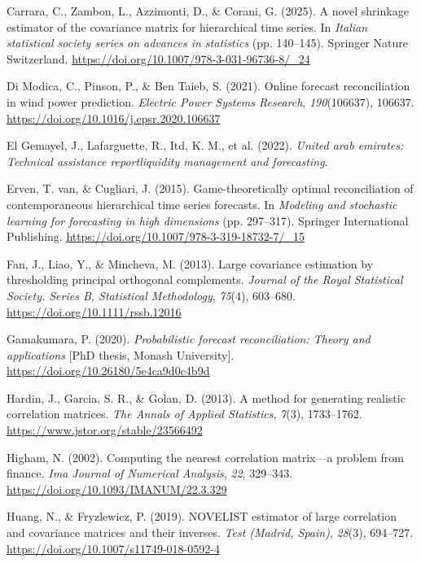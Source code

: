 \documentclass[
  11pt,
  letterpaper,
  DIV=11,
  numbers=noendperiod,
  titlepage]{scrartcl}
\newlength{\cslhangindent}
\newenvironment{CSLReferences}[2] %
 {\begin{list}{}{%
  \setlength{\itemindent}{0pt}
  \setlength{\leftmargin}{0pt}
  \setlength{\parsep}{0pt}
  \ifodd #1
   \setlength{\leftmargin}{\cslhangindent}
   \setlength{\itemindent}{-1\cslhangindent}
  \fi
  \setlength{\itemsep}{#2\baselineskip}}}
 {\end{list}}
\begin{document}
\begin{CSLReferences}{1}{0}
Carrara, C., Zambon, L., Azzimonti, D., \& Corani, G. (2025). A novel
shrinkage estimator of the covariance matrix for hierarchical time
series. In \emph{Italian statistical society series on advances in
statistics} (pp. 140--145). Springer Nature Switzerland.
\url{https://doi.org/10.1007/978-3-031-96736-8/_24}

Di Modica, C., Pinson, P., \& Ben Taieb, S. (2021). Online forecast
reconciliation in wind power prediction. \emph{Electric Power Systems
Research}, \emph{190}(106637), 106637.
\url{https://doi.org/10.1016/j.epsr.2020.106637}

El Gemayel, J., Lafarguette, R., Itd, K. M., et al. (2022). \emph{United
arab emirates: Technical assistance reportliquidity management and
forecasting}.

Erven, T. van, \& Cugliari, J. (2015). Game-theoretically optimal
reconciliation of contemporaneous hierarchical time series forecasts. In
\emph{Modeling and stochastic learning for forecasting in high
dimensions} (pp. 297--317). Springer International Publishing.
\url{https://doi.org/10.1007/978-3-319-18732-7/_15}

Fan, J., Liao, Y., \& Mincheva, M. (2013). Large covariance estimation
by thresholding principal orthogonal complements. \emph{Journal of the
Royal Statistical Society. Series B, Statistical Methodology},
\emph{75}(4), 603--680. \url{https://doi.org/10.1111/rssb.12016}

Gamakumara, P. (2020). \emph{Probabilistic forecast reconciliation:
Theory and applications} {[}PhD thesis, Monash University{]}.
\url{https://doi.org/10.26180/5e4ca9d0c4b9d}

Hardin, J., Garcia, S. R., \& Golan, D. (2013). A method for generating
realistic correlation matrices. \emph{The Annals of Applied Statistics},
\emph{7}(3), 1733--1762. \url{https://www.jstor.org/stable/23566492}

Higham, N. (2002). Computing the nearest correlation matrix---a problem
from finance. \emph{Ima Journal of Numerical Analysis}, \emph{22},
329--343. \url{https://doi.org/10.1093/IMANUM/22.3.329}

Huang, N., \& Fryzlewicz, P. (2019). {NOVELIST} estimator of large
correlation and covariance matrices and their inverses. \emph{Test
(Madrid, Spain)}, \emph{28}(3), 694--727.
\url{https://doi.org/10.1007/s11749-018-0592-4}


\end{CSLReferences}
\end{document}
